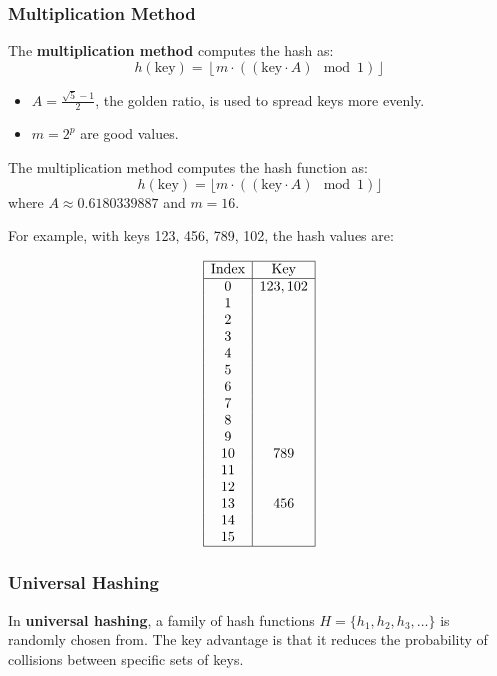 \subsubsection{Multiplication Method}
\begin{definition}
The \textbf{multiplication method} computes the hash as:
\[
h(\text{key}) = \left\lfloor m \cdot ((\text{key} \cdot A) \mod 1) \right\rfloor
\]
\begin{itemize}
    \item \( A = \frac{\sqrt{5} - 1}{2} \), the golden ratio, is used to spread keys more evenly. 
    \item $m = 2^p$ are good values.  
\end{itemize}
\end{definition}

\begin{example}
        The multiplication method computes the hash function as: 
    \[
    h(\text{key}) = \lfloor m \cdot ((\text{key} \cdot A) \mod 1) \rfloor
    \]
    where \( A \approx 0.6180339887 \) and \( m = 16 \).

    For example, with keys 123, 456, 789, 102, the hash values are:

    \[
    \begin{array}{|c|c|}
    \hline
    \text{Index} & \text{Key} \\
    \hline
    0 & 123, 102 \\
    1 &  \\
    2 &  \\
    3 &  \\
    4 &  \\
    5 &  \\
    6 &  \\
    7 &  \\
    8 &  \\
    9 &  \\
    10 & 789 \\
    11 &  \\
    12 &  \\
    13 & 456 \\
    14 &  \\
    15 &  \\
    \hline
    \end{array}
    \]    
\end{example}

\subsubsection{Universal Hashing}
\begin{definition}
In \textbf{universal hashing}, a family of hash functions \( H = \{ h_1, h_2, h_3, \ldots \} \) is randomly chosen from. The key advantage is that it reduces the probability of collisions between specific sets of keys.
\end{definition}

